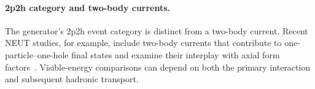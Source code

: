 \paragraph{2p2h category and two-body currents.} The generator's 2p2h event category is distinct from a two-body current. Recent NEUT studies, for example, include two-body currents that contribute to one-particle--one-hole final states and examine their interplay with axial form factors~\cite{FrancoMunoz:2026currents}. Visible-energy comparisons can depend on both the primary interaction and subsequent hadronic transport.

